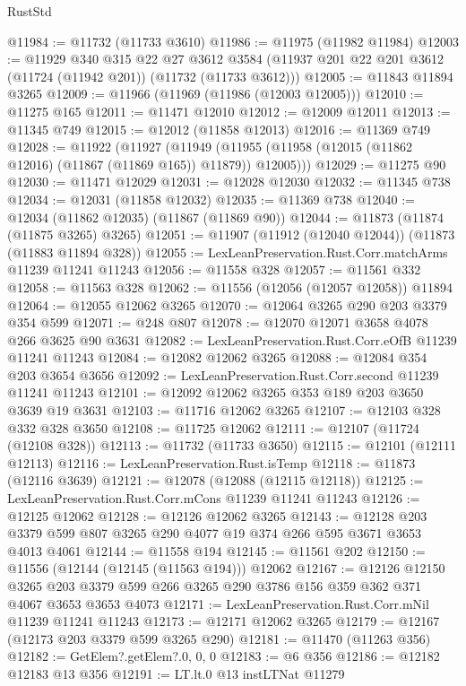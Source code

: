 \begin{lexlean}{RustStd}
\begin{coremodule}
@11984 := @11732 (@11733 @3610)
@11986 := @11975 (@11982 @11984)
@12003 := @11929
    @340
    @315
    @22
    @27
    @3612
    @3584
    (@11937 @201 @22 @201 @3612 (@11724 (@11942 @201)) (@11732 (@11733 @3612)))
@12005 := @11843 @11894 @3265
@12009 := @11966 (@11969 (@11986 (@12003 @12005)))
@12010 := @11275 @165
@12011 := @11471 @12010
@12012 := @12009 @12011
@12013 := @11345 @749
@12015 := @12012 (@11858 @12013)
@12016 := @11369 @749
@12028 := @11922
    (@11927
      (@11949 (@11955 (@11958 (@12015 (@11862 @12016) (@11867 (@11869 @165)) @11879)) @12005)))
@12029 := @11275 @90
@12030 := @11471 @12029
@12031 := @12028 @12030
@12032 := @11345 @738
@12034 := @12031 (@11858 @12032)
@12035 := @11369 @738
@12040 := @12034 (@11862 @12035) (@11867 (@11869 @90))
@12044 := @11873 (@11874 (@11875 @3265) @3265)
@12051 := @11907 (@11912 (@12040 @12044)) (@11873 (@11883 @11894 @328))
@12055 := LexLeanPreservation.Rust.Corr.matchArms @11239 @11241 @11243
@12056 := @11558 @328
@12057 := @11561 @332
@12058 := @11563 @328
@12062 := @11556 (@12056 (@12057 @12058)) @11894
@12064 := @12055 @12062 @3265
@12070 := @12064 @3265 @290 @203 @3379 @354 @599
@12071 := @248 @807
@12078 := @12070 @12071 @3658 @4078 @266 @3625 @90 @3631
@12082 := LexLeanPreservation.Rust.Corr.eOfB @11239 @11241 @11243
@12084 := @12082 @12062 @3265
@12088 := @12084 @354 @203 @3654 @3656
@12092 := LexLeanPreservation.Rust.Corr.second @11239 @11241 @11243
@12101 := @12092 @12062 @3265 @353 @189 @203 @3650 @3639 @19 @3631
@12103 := @11716 @12062 @3265
@12107 := @12103 @328 @332 @328 @3650
@12108 := @11725 @12062
@12111 := @12107 (@11724 (@12108 @328))
@12113 := @11732 (@11733 @3650)
@12115 := @12101 (@12111 @12113)
@12116 := LexLeanPreservation.Rust.isTemp
@12118 := @11873 (@12116 @3639)
@12121 := @12078 (@12088 (@12115 @12118))
@12125 := LexLeanPreservation.Rust.Corr.mCons @11239 @11241 @11243
@12126 := @12125 @12062
@12128 := @12126 @12062 @3265
@12143 := @12128 @203 @3379 @599 @807 @3265 @290 @4077 @19 @374 @266 @595 @3671 @3653 @4013 @4061
@12144 := @11558 @194
@12145 := @11561 @202
@12150 := @11556 (@12144 (@12145 (@11563 @194))) @12062
@12167 := @12126
    @12150
    @3265
    @203
    @3379
    @599
    @266
    @3265
    @290
    @3786
    @156
    @359
    @362
    @371
    @4067
    @3653
    @3653
    @4073
@12171 := LexLeanPreservation.Rust.Corr.mNil @11239 @11241 @11243
@12173 := @12171 @12062 @3265
@12179 := @12167 (@12173 @203 @3379 @599 @3265 @290)
@12181 := @11470 (@11263 @356)
@12182 := GetElem?.getElem?.{0, 0, 0}
@12183 := @6 @356
@12186 := @12182 @12183 @13 @356
@12191 := LT.lt.{0} @13 instLTNat @11279

\end{coremodule}
\end{lexlean}
